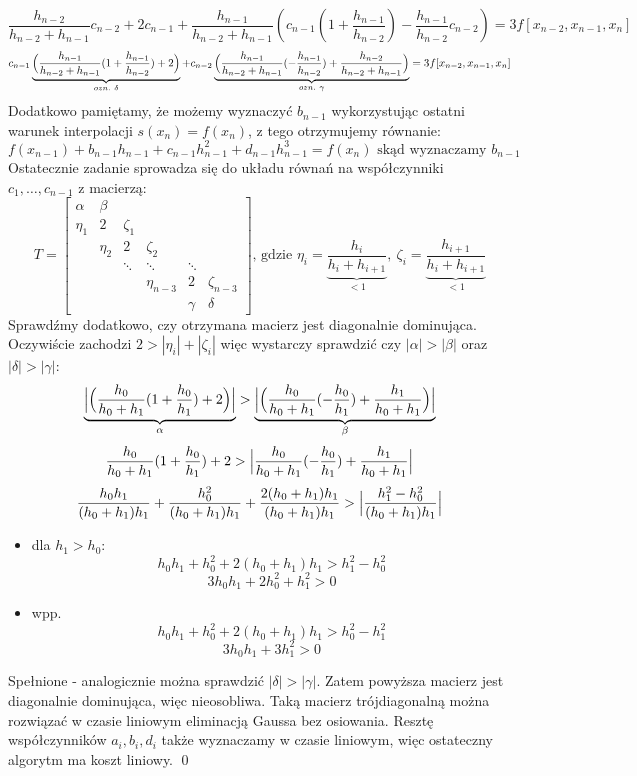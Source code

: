 \documentclass[a4paper]{article}
\begin{document}
$$
\frac{h_{n-2}}{h_{n-2}+h_{n-1}}c_{n-2} + 2c_{n-1} + \frac{h_{n-1}}{h_{n-2} + h_{n-1}}(c_{n-1}(1+\frac{h_{n-1}}{h_{n-2}}) - \frac{h_{n-1}}{h_{n-2}}c_{n-2}) = 3f[x_{n-2}, x_{n-1},x_{n}]
$$
$$
c_{n-1}\underbrace{\Bigl(\frac{h_{n-1}}{h_{n-2}+h_{n-1}}(1+\frac{h_{n-1}}{h_{n-2}}) + 2 \Bigr)}_{ozn.\ \delta} +
c_{n-2}\underbrace{\Bigl(\frac{h_{n-1}}{h_{n-2}+h_{n-1}}(-\frac{h_{n-1}}{h_{n-2}}) + \frac{h_{n-2}}{h_{n-2}+h_{n-1}} \Bigr)}_{ozn.\ \gamma}
= 3f[x_{n-2}, x_{n-1},x_{n}]
$$
Dodatkowo pamiętamy, że możemy wyznaczyć $b_{n-1}$ wykorzystując ostatni warunek interpolacji $s(x_n)=f(x_n)$, z tego otrzymujemy równanie:
$$
f(x_{n-1}) + b_{n-1}h_{n-1} + c_{n-1}h^2_{n-1} + d_{n-1}h^3_{n-1} = f(x_n) \text{ skąd wyznaczamy } b_{n-1}
$$
Ostatecznie zadanie sprowadza się do układu równań na współczynniki $c_1,\dots,c_{n-1}$ z macierzą:
$$
T = \begin{bmatrix}
\alpha & \beta &  &  & & \\
\eta_1 & 2 & \zeta_1 &  &  & \\
& \eta_2 & 2 & \zeta_2 &  & \\
&  & \ddots & \ddots & \ddots  &\\
&  &  & \eta_{n-3} & 2 & \zeta_{n-3} \\
&  &  &  & \gamma & \delta
\end{bmatrix}
\text{, gdzie } \eta_i = \underbrace{\frac{h_i}{h_i+h_{i+1}}}_{ < 1},\
\zeta_i = \underbrace{\frac{h_{i+1}}{h_i+h_{i+1}}}_{< 1}
$$
Sprawdźmy dodatkowo, czy otrzymana macierz jest diagonalnie dominująca. Oczywiście zachodzi $2 > |\eta_i| + |\zeta_i|$ więc wystarczy sprawdzić czy $|\alpha| > |\beta|$ oraz $|\delta| > |\gamma|$:
$$
\underbrace{\Bigl|\Bigl(\frac{h_0}{h_0+h_1}(1+\frac{h_0}{h_1})+2\Bigr)\Bigr|}_{\alpha} > \underbrace{\Bigl|\Bigl(\frac{h_0}{h_0+h_1}(-\frac{h_0}{h_1})+\frac{h_{1}}{h_0 + h_{1}} \Bigr)\Bigr|}_{\beta}
$$
$$
\frac{h_0}{h_0+h_1}(1+\frac{h_0}{h_1})+2 >
\Bigl|\frac{h_0}{h_0+h_1}(-\frac{h_0}{h_1})+\frac{h_{1}}{h_0 + h_{1}} \Bigr|
$$
$$
\frac{h_0 h_1}{(h_0+h_1)h_1}+ \frac{h_0^2}{(h_0+h_1)h_1}+ \frac{2(h_0+h_1)h_1}{(h_0+h_1)h_1} >
\Bigl|\frac{h_{1}^2-h_{0}^2}{(h_0+h_1)h_1}\Bigr|
$$
\begin{itemize}
	\item dla $h_1 > h_0$: \\
	      $$
	      h_0 h_1+ h_0^2 + 2(h_0+h_1)h_1 > h_{1}^2-h_{0}^2
	      $$
	      $$
	      3h_0h_1+ 2h_0^2 + h_1^2 > 0
	      $$
	\item wpp. \\
	      $$
	      h_0 h_1+ h_0^2 + 2(h_0+h_1)h_1 > h_{0}^2-h_{1}^2
	      $$
	      $$
	      3h_0h_1 + 3h_1^2 > 0
	      $$
\end{itemize}
Spełnione - analogicznie można sprawdzić $|\delta| > |\gamma|$. Zatem powyższa macierz jest diagonalnie dominująca, więc nieosobliwa. Taką macierz trójdiagonalną można rozwiązać w czasie liniowym eliminacją Gaussa bez osiowania. Resztę współczynników $a_i, b_i, d_i$ także wyznaczamy w czasie liniowym, więc ostateczny algorytm ma koszt liniowy. \qed
\end{document}
